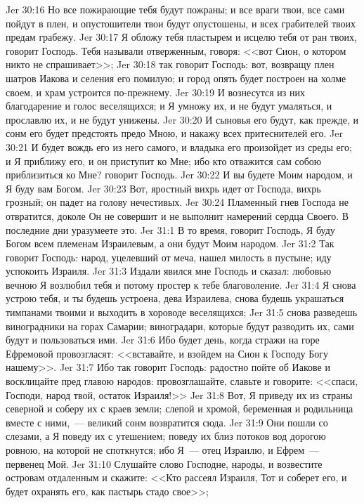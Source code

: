 \vs Jer 30:16 Но все пожирающие тебя будут пожраны; и все враги твои, все сами пойдут в плен, и опустошители твои будут опустошены, и всех грабителей твоих предам грабежу.
\vs Jer 30:17 Я обложу тебя пластырем и исцелю тебя от ран твоих, говорит Господь. Тебя называли отверженным, говоря: <<вот Сион, о котором никто не спрашивает>>;
\vs Jer 30:18 так говорит Господь: вот, возвращу плен шатров Иакова и селения его помилую; и город опять будет построен на холме своем, и храм устроится по-прежнему.
\vs Jer 30:19 И вознесутся из них благодарение и голос веселящихся; и Я умножу их, и не будут умаляться, и прославлю их, и не будут унижены.
\vs Jer 30:20 И сыновья его будут, как прежде, и сонм его будет предстоять предо Мною, и накажу всех притеснителей его.
\vs Jer 30:21 И будет вождь его из него самого, и владыка его произойдет из среды его; и Я приближу его, и он приступит ко Мне; ибо кто отважится сам собою приблизиться ко Мне? говорит Господь.
\vs Jer 30:22 И вы будете Моим народом, и Я буду вам Богом.
\vs Jer 30:23 Вот, яростный вихрь идет от Господа, вихрь грозный; он падет на голову нечестивых.
\vs Jer 30:24 Пламенный гнев Господа не отвратится, доколе Он не совершит и не выполнит намерений сердца Своего. В последние дни уразумеете это.
\vs Jer 31:1 В то время, говорит Господь, Я буду Богом всем племенам Израилевым, а они будут Моим народом.
\vs Jer 31:2 Так говорит Господь: народ, уцелевший от меча, нашел милость в пустыне; иду успокоить Израиля.
\vs Jer 31:3 Издали явился мне Господь и сказал: любовью вечною Я возлюбил тебя и потому простер к тебе благоволение.
\vs Jer 31:4 Я снова устрою тебя, и ты будешь устроена, дева Израилева, снова будешь украшаться тимпанами твоими и выходить в хороводе веселящихся;
\vs Jer 31:5 снова разведешь виноградники на горах Самарии; виноградари, которые будут разводить их, сами будут и пользоваться ими.
\vs Jer 31:6 Ибо будет день, когда стражи на горе Ефремовой провозгласят: <<вставайте, и взойдем на Сион к Господу Богу нашему>>.
\vs Jer 31:7 Ибо так говорит Господь: радостно пойте об Иакове и восклицайте пред главою народов: провозглашайте, славьте и говорите: <<спаси, Господи, народ твой, остаток Израиля!>>
\vs Jer 31:8 Вот, Я приведу их из страны северной и соберу их с краев земли; слепой и хромой, беременная и родильница вместе с ними,~--- великий сонм возвратится сюда.
\vs Jer 31:9 Они пошли со слезами, а Я поведу их с утешением; поведу их близ потоков вод дорогою ровною, на которой не споткнутся; ибо Я~--- отец Израилю, и Ефрем~--- первенец Мой.
\vs Jer 31:10 Слушайте слово Господне, народы, и возвестите островам отдаленным и скажите: <<Кто рассеял Израиля, Тот и соберет его, и будет охранять его, как пастырь стадо свое>>;
